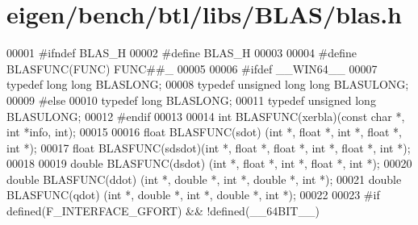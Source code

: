 \hypertarget{eigen_2bench_2btl_2libs_2_b_l_a_s_2blas_8h_source}{}\section{eigen/bench/btl/libs/\+B\+L\+A\+S/blas.h}
\label{eigen_2bench_2btl_2libs_2_b_l_a_s_2blas_8h_source}

\begin{DoxyCode}
00001 \textcolor{preprocessor}{#ifndef BLAS\_H}
00002 \textcolor{preprocessor}{#define BLAS\_H}
00003 
00004 \textcolor{preprocessor}{#define BLASFUNC(FUNC) FUNC##\_}
00005 
00006 \textcolor{preprocessor}{#ifdef \_\_WIN64\_\_}
00007 \textcolor{keyword}{typedef} \textcolor{keywordtype}{long} \textcolor{keywordtype}{long} BLASLONG;
00008 \textcolor{keyword}{typedef} \textcolor{keywordtype}{unsigned} \textcolor{keywordtype}{long} \textcolor{keywordtype}{long} BLASULONG;
00009 \textcolor{preprocessor}{#else}
00010 \textcolor{keyword}{typedef} \textcolor{keywordtype}{long} BLASLONG;
00011 \textcolor{keyword}{typedef} \textcolor{keywordtype}{unsigned} \textcolor{keywordtype}{long} BLASULONG;
00012 \textcolor{preprocessor}{#endif}
00013 
00014 \textcolor{keywordtype}{int}    BLASFUNC(xerbla)(\textcolor{keyword}{const} \textcolor{keywordtype}{char} *, \textcolor{keywordtype}{int} *info, int);
00015 
00016 \textcolor{keywordtype}{float}  BLASFUNC(sdot)  (\textcolor{keywordtype}{int} *, \textcolor{keywordtype}{float}  *, \textcolor{keywordtype}{int} *, \textcolor{keywordtype}{float}  *, \textcolor{keywordtype}{int} *);
00017 \textcolor{keywordtype}{float}  BLASFUNC(sdsdot)(\textcolor{keywordtype}{int} *, \textcolor{keywordtype}{float}  *,        \textcolor{keywordtype}{float}  *, \textcolor{keywordtype}{int} *, \textcolor{keywordtype}{float}  *, \textcolor{keywordtype}{int} *);
00018 
00019 \textcolor{keywordtype}{double} BLASFUNC(dsdot) (\textcolor{keywordtype}{int} *, \textcolor{keywordtype}{float}  *, \textcolor{keywordtype}{int} *, \textcolor{keywordtype}{float}  *, \textcolor{keywordtype}{int} *);
00020 \textcolor{keywordtype}{double} BLASFUNC(ddot)  (\textcolor{keywordtype}{int} *, \textcolor{keywordtype}{double} *, \textcolor{keywordtype}{int} *, \textcolor{keywordtype}{double} *, \textcolor{keywordtype}{int} *);
00021 \textcolor{keywordtype}{double} BLASFUNC(qdot)  (\textcolor{keywordtype}{int} *, \textcolor{keywordtype}{double} *, \textcolor{keywordtype}{int} *, \textcolor{keywordtype}{double} *, \textcolor{keywordtype}{int} *);
00022 
00023 \textcolor{preprocessor}{#if defined(F\_INTERFACE\_GFORT) && !defined(\_\_64BIT\_\_)}

\end{DoxyCode}
